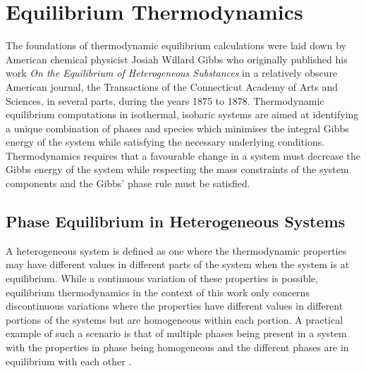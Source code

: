 \chapter{Equilibrium Thermodynamics} \label{chap:equilibrium}

	The foundations of thermodynamic equilibrium calculations were laid down by American chemical physicist Josiah Willard Gibbs who originally published his work \emph{On the Equilibrium of Heterogeneous Substances} in a relatively obscure American journal, the Transactions of the Connecticut Academy of Arts and Sciences, in several parts, during the years 1875 to 1878. Thermodynamic equilibrium computations in isothermal, isobaric systems are aimed at identifying a unique combination of phases and species which minimises the integral Gibbs energy of the system while satisfying the necessary underlying conditions. Thermodynamics requires that a favourable change in a system must decrease the Gibbs energy of the system while respecting the mass constraints of the system components and the Gibbs' phase rule must be satisfied.
	
\section{Phase Equilibrium in Heterogeneous Systems} \label{sec:multi_eqb}
	A heterogeneous system is defined as one where the thermodynamic properties may have different values in different parts of the system when the system is at equilibrium. While a continuous variation of these properties is possible, equilibrium thermodynamics in the context of this work only concerns discontinuous variations where the properties have different values in different portions of the systems but are homogeneous within each portion. A practical example of such a scenario is that of multiple phases being present in a system with the properties in phase being homogeneous and the different phases are in equilibrium with each other \cite{liu_wang_2016}.
	
